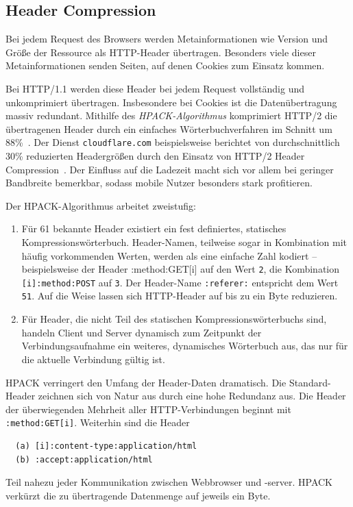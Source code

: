 \documentclass[a4paper, justified, notoc]{tufte-handout} %
\begin{document}
\subsection{Header Compression} %
\label{sub:header_compression}

Bei jedem Request des Browsers werden Metainformationen wie Version und Größe der Ressource als HTTP-Header übertragen. Besonders viele dieser Metainformationen senden Seiten, auf denen Cookies zum Einsatz kommen.

Bei HTTP/1.1 werden diese Header bei jedem Request vollständig und unkomprimiert übertragen. Insbesondere bei Cookies ist die Datenübertragung massiv redundant. Mithilfe des \emph{HPACK-Algorithmus} komprimiert HTTP/2 die übertragenen Header durch ein einfaches Wörterbuchverfahren im Schnitt um 88\%~\citep{heise:2018}. Der Dienst \texttt{cloudflare.com} beispielsweise berichtet von durchschnittlich 30\% reduzierten Headergrößen durch den Einsatz von HTTP/2 Header Compression~\citep{vlad:2016}. Der Einfluss auf die Ladezeit macht sich vor allem bei geringer Bandbreite bemerkbar, sodass mobile Nutzer besonders stark profitieren.

Der HPACK-Algorithmus arbeitet zweistufig:
\begin{enumerate}
	\item Für 61 bekannte Header existiert ein fest definiertes, statisches Kompressionswörterbuch. Header-Namen, teilweise sogar in Kombination mit häufig vorkommenden Werten, werden als eine einfache Zahl kodiert -- beispielsweise der Header :method:GET[i] auf den Wert \texttt{2}, die Kombination \texttt{[i]:method:POST} auf \texttt{3}. Der Header-Name \texttt{:referer:} entspricht dem Wert \texttt{51}. Auf die Weise lassen sich HTTP-Header auf bis zu ein Byte reduzieren.
	\item Für Header, die nicht Teil des statischen Kompressionswörterbuchs sind, handeln Client und Server dynamisch zum Zeitpunkt der Verbindungsaufnahme ein weiteres, dynamisches Wörterbuch aus, das nur für die aktuelle Verbindung gültig ist.
\end{enumerate}

HPACK verringert den Umfang der Header-Daten dramatisch. Die Standard-Header zeichnen sich von Natur aus durch eine hohe Redundanz aus. Die Header der überwiegenden Mehrheit aller HTTP-Verbindungen beginnt mit \texttt{:method:GET[i]}. Weiterhin sind die Header 
\begin{Verbatim}
  (a) [i]:content-type:application/html
  (b) :accept:application/html
\end{Verbatim}
Teil nahezu jeder Kommunikation zwischen Webbrowser und -server. HPACK verkürzt die zu übertragende Datenmenge auf jeweils ein Byte.
\end{document}
